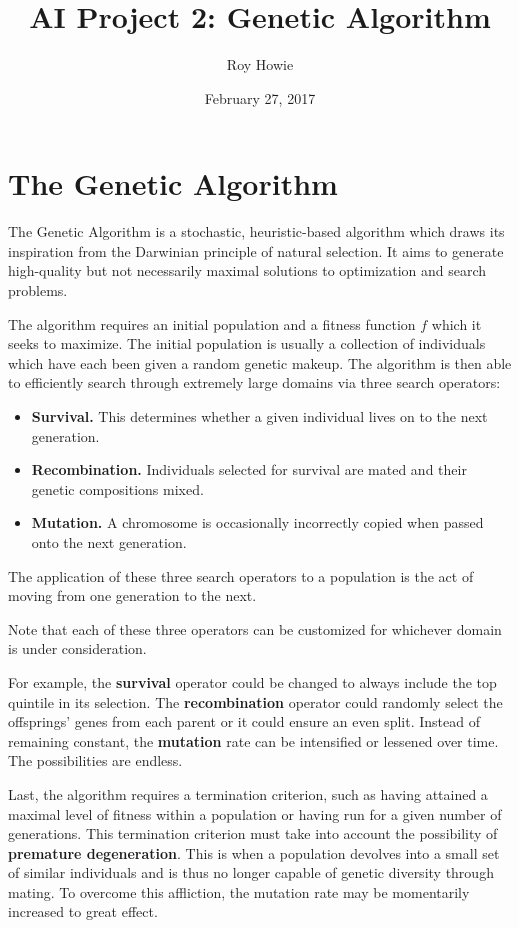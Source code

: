 \documentclass{article}
\begin{document}
\title{\vspace{-1cm}AI Project 2: Genetic Algorithm}
\author{Roy Howie}
\date{February 27, 2017}
\maketitle

\section{The Genetic Algorithm}
  The Genetic Algorithm is a stochastic, heuristic-based algorithm which draws
  its inspiration from the Darwinian principle of natural selection. It aims to
  generate high-quality but not necessarily maximal solutions to optimization
  and search problems.

  The algorithm requires an initial population and a fitness function $f$ which
  it seeks to maximize. The initial population is usually a collection of
  individuals which have each been given a random genetic makeup. The algorithm
  is then able to efficiently search through extremely large domains via three
  search operators:
  \begin{itemize}
    \renewcommand\labelitemi{}
    \item{
      \textbf{Survival.} This determines whether a given individual lives on to
      the next generation.
    }
    \item{
      \textbf{Recombination.} Individuals selected for survival are mated and
      their genetic compositions mixed.
    }
    \item{
      \textbf{Mutation.} A chromosome is occasionally incorrectly copied when
      passed onto the next generation.
    }
  \end{itemize}
  The application of these three search operators to a population is the act of
  moving from one generation to the next.

  Note that each of these three operators can be customized for whichever domain
  is under consideration.

  For example, the \textbf{survival} operator could be changed to always include
  the top quintile in its selection. The \textbf{recombination} operator could
  randomly select the offsprings' genes from each parent or it could ensure an
  even split. Instead of remaining constant, the \textbf{mutation} rate can be
  intensified or lessened over time. The possibilities are endless.

  Last, the algorithm requires a termination criterion, such as having
  attained a maximal level of fitness within a population or having run for a
  given number of generations. This termination criterion must take into account
  the possibility of \textbf{premature degeneration}. This is when a population
  devolves into a small set of similar individuals and is thus no longer capable
  of genetic diversity through mating. To overcome this affliction, the mutation
  rate may be momentarily increased to great effect.
\end{document}
